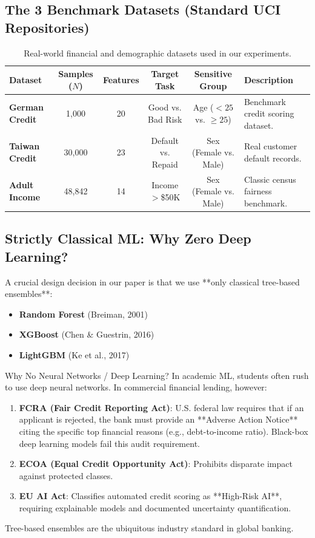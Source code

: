\documentclass[11pt,a4paper]{article}
\begin{document}
\subsection{The 3 Benchmark Datasets (Standard UCI Repositories)}
\begin{table}[htbp]
\centering
\small
\begin{tabularx}{\textwidth}{@{}lccccX@{}}
\toprule
\textbf{Dataset} & \textbf{Samples ($N$)} & \textbf{Features} & \textbf{Target Task} & \textbf{Sensitive Group} & \textbf{Description} \\
\midrule
\textbf{German Credit} & 1,000 & 20 & Good vs. Bad Risk & Age ($<25$ vs. $\ge 25$) & Benchmark credit scoring dataset. \\
\textbf{Taiwan Credit} & 30,000 & 23 & Default vs. Repaid & Sex (Female vs. Male) & Real customer default records. \\
\textbf{Adult Income} & 48,842 & 14 & Income $>$\$50K & Sex (Female vs. Male) & Classic census fairness benchmark. \\
\bottomrule
\end{tabularx}
\caption{Real-world financial and demographic datasets used in our experiments.}
\label{tab:datasets}
\end{table}

\subsection{Strictly Classical ML: Why Zero Deep Learning?}
A crucial design decision in our paper is that we use **only classical tree-based ensembles**:
\begin{itemize}[leftmargin=1.5em]
    \item \textbf{Random Forest} (Breiman, 2001)
    \item \textbf{XGBoost} (Chen \& Guestrin, 2016)
    \item \textbf{LightGBM} (Ke et al., 2017)
\end{itemize}

\begin{conceptbox}{Why No Neural Networks / Deep Learning?}
In academic ML, students often rush to use deep neural networks. In commercial financial lending, however:
\begin{enumerate}[leftmargin=1.5em]
    \item \textbf{FCRA (Fair Credit Reporting Act)}: U.S. federal law requires that if an applicant is rejected, the bank must provide an **Adverse Action Notice** citing the specific top financial reasons (e.g., debt-to-income ratio). Black-box deep learning models fail this audit requirement.
    \item \textbf{ECOA (Equal Credit Opportunity Act)}: Prohibits disparate impact against protected classes.
    \item \textbf{EU AI Act}: Classifies automated credit scoring as **High-Risk AI**, requiring explainable models and documented uncertainty quantification.
\end{enumerate}
Tree-based ensembles are the ubiquitous industry standard in global banking.
\end{conceptbox}
\end{document}
